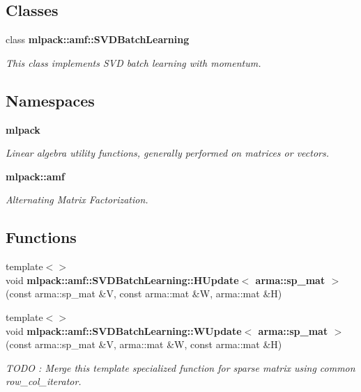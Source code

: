 \subsection*{Classes}
\begin{DoxyCompactItemize}
\item 
class {\bf mlpack\+::amf\+::\+S\+V\+D\+Batch\+Learning}
\begin{DoxyCompactList}\small\item\em This class implements S\+VD batch learning with momentum. \end{DoxyCompactList}\end{DoxyCompactItemize}
\subsection*{Namespaces}
\begin{DoxyCompactItemize}
\item 
 {\bf mlpack}
\begin{DoxyCompactList}\small\item\em Linear algebra utility functions, generally performed on matrices or vectors. \end{DoxyCompactList}\item 
 {\bf mlpack\+::amf}
\begin{DoxyCompactList}\small\item\em Alternating Matrix Factorization. \end{DoxyCompactList}\end{DoxyCompactItemize}
\subsection*{Functions}
\begin{DoxyCompactItemize}
\item 
{\footnotesize template$<$$>$ }\\void {\bf mlpack\+::amf\+::\+S\+V\+D\+Batch\+Learning\+::\+H\+Update$<$ arma\+::sp\+\_\+mat $>$} (const arma\+::sp\+\_\+mat \&V, const arma\+::mat \&W, arma\+::mat \&H)
\item 
{\footnotesize template$<$$>$ }\\void {\bf mlpack\+::amf\+::\+S\+V\+D\+Batch\+Learning\+::\+W\+Update$<$ arma\+::sp\+\_\+mat $>$} (const arma\+::sp\+\_\+mat \&V, arma\+::mat \&W, const arma\+::mat \&H)
\begin{DoxyCompactList}\small\item\em T\+O\+DO \+: Merge this template specialized function for sparse matrix using common row\+\_\+col\+\_\+iterator. \end{DoxyCompactList}\end{DoxyCompactItemize}


